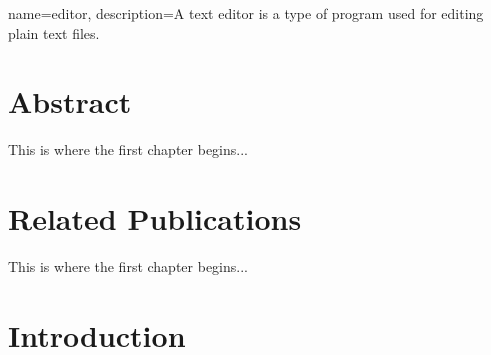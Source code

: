 
{
	name={editor},
	description={A text editor is a type of program used for editing plain text files.}
}

\chapter{Abstract}

This is where the first chapter begins...

\chapter{Related Publications}

This is where the first chapter begins...

\chapter{Introduction}


